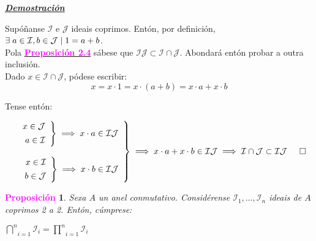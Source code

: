 \documentclass[twoside]{report}
\newcommand{\magbf}[1]{\textcolor{magenta}{\textbf{#1}}} %
\theoremstyle{mystyle}
\newtheorem{prop}{\magbf{Proposición}}[chapter]
\newenvironment{proposition}
{\begin{mdframed}[linecolor = magenta,backgroundcolor = classicrose, linewidth = 2mm]\begin{prop}}
{\end{prop}\end{mdframed}}
\begin{document}
\vspace{2mm}

\noindent \textbf{\textit{\underline{Demostración}}}

\vspace{2mm}

\noindent Supóñanse $\mathcal{I}$ e $\mathcal{J}$ ideais coprimos. Entón, por definición, $\exists \hspace{1mm} a \in \mathcal{I}, b \in \mathcal{J} \hspace{1mm} | \hspace{1mm} 1 = a + b$.\\

\noindent Pola \hyperref[prop2.4]{\magbf{Proposición 2.4}} sábese que $\mathcal{IJ} \subset \mathcal{I \cap J}$. Abondará entón probar a outra inclusión.\\

\noindent Dado $x \in \mathcal{I \cap J}$, pódese escribir:
$$x = x \cdot 1 = x \cdot (a + b) = x \cdot a + x \cdot b$$

\noindent Tense entón:

$$
\left. \begin{array}{r} 
\left. \begin{array}{r} 
x \in \mathcal{J}\\[1ex]
a \in \mathcal{I}
\end{array} \right\} 
\implies x \cdot a \in \mathcal{IJ} \\
\\
\left. \begin{array}{r}
x \in \mathcal{I}\\[1ex]
b \in \mathcal{J}
\end{array} \right\} 
\implies x \cdot b \in \mathcal{IJ}
\end{array} \right\} 
\implies x \cdot a + x \cdot b \in \mathcal{IJ} \implies \mathcal{I \cap J} \subset \mathcal{IJ} \hspace{5mm} \square
$$

\vspace{3mm}

\begin{proposition} \label{prop2.7}
Sexa $A$ un anel conmutativo. Considérense $\mathcal{I}_{1}, \dots, \mathcal{I}_{n}$ ideais de $A$ coprimos 2 a 2. Entón, cúmprese:
\begin{center}
    $\underset{i = 1}{\overset{n}{\bigcap}}\mathcal{I}_{i} = \underset{i = 1}{\overset{n}{\prod}}\mathcal{I}_{i}$  
\end{center}
\end{proposition}
\end{document}

